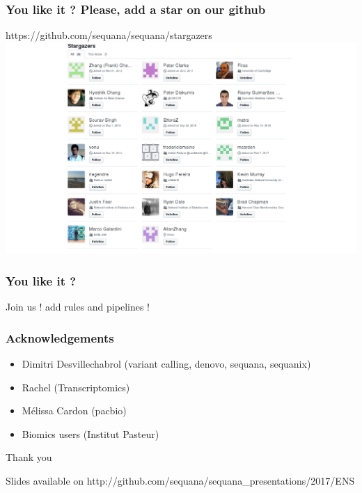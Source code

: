 \documentclass{beamer}
\begin{document}
\begin{frame}
\frametitle{You like it ? Please, add a star on our github}
    https://github.com/sequana/sequana/stargazers
    \centering
    \includegraphics[scale=0.28]{images/stargazers.png}\\
\end{frame}


\begin{frame}
\frametitle{You like it ? }
\centering
Join us ! add rules and pipelines !
\end{frame}



    
    



\begin{frame}
 \frametitle{Acknowledgements}

 \begin{itemize}
  \item Dimitri Desvillechabrol (variant calling, denovo, sequana, sequanix)
  \item Rachel (Transcriptomics)
  \item M\'elissa Cardon (pacbio)
  \item Biomics users (Institut Pasteur)
 \end{itemize}
 
\end{frame}


\begin{frame}
\centering
\vspace{2cm}
\LARGE
 Thank you 
 
 \vspace{2cm}
 
 \small
 Slides available on http://github.com/sequana/sequana\_presentations/2017/ENS
\end{frame}
\end{document}

